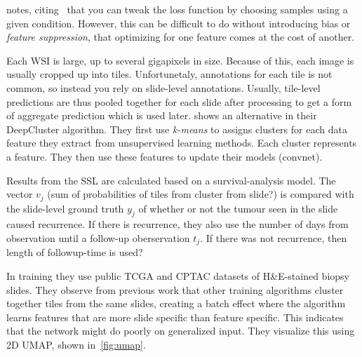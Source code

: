 \documentclass[10pt,twocolumn,letterpaper]{article}
\begin{document}
\cite{sslUMAP} notes, citing~\cite{contrastiveShortcut} that you can tweak the loss function by choosing samples using a given condition. However, this can be difficult to do without introducing bias or \textit{feature suppression}, that optimizing for one feature comes at the cost of another. 

Each \gls{WSI} is large, up to several gigapixels in size. Because of this, each image is usually cropped up into tiles. Unfortunetaly, annotations for each tile is not common, so instead you rely on slide-level annotations. Usually, tile-level predictions are thus pooled together for each slide after processing to get a form of aggregate prediction which is used later. \cite{unsupervisedClustering} shows an alternative in their DeepCluster algorithm. They first use \textit{k-means} to assigns clusters for each data feature they extract from unsupervised learning methods. Each cluster represents a feature. They then use these features to update their models (convnet). 


Results from the \gls{SSL} are calculated based on a survival-analysis model. The vector $v_{j}$ (sum of probabilities of tiles from cluster from slide?) is compared with the slide-level ground truth $y_{j}$ of whether or not the tumour seen in the slide caused recurrence. If there is recurrence, they also use the number of days from observation until a follow-up oberservation $t_{j}$. If there was not recurrence, then length of followup-time is used? %

In training they use public TCGA and CPTAC datasets of H\&E-stained biopsy slides. They observe from previous work that other training algorithms cluster together tiles from the same slides, creating a batch effect where the algorithm learns features that are more slide specific than feature specific. This indicates that the network might do poorly on generalized input. They visualize this using 2D \gls{UMAP}, shown in~\cref{fig:umap}.
\end{document}
